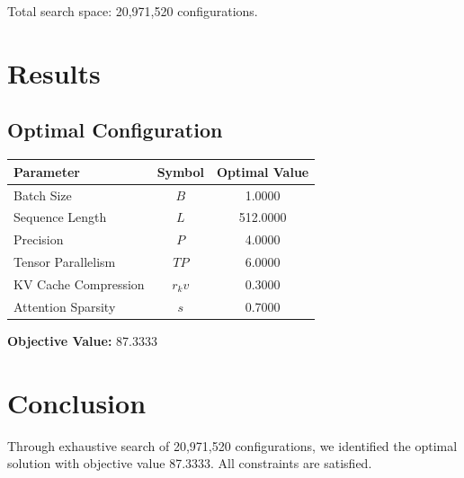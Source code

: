 \documentclass[11pt,a4paper]{article}
\begin{document}
Total search space: 20,971,520 configurations.

\section{Results}

\subsection{Optimal Configuration}

\begin{center}
\begin{tabular}{|l|c|c|}
\hline
Parameter & Symbol & Optimal Value \\
\hline
Batch Size & $B$ & 1.0000 \\
Sequence Length & $L$ & 512.0000 \\
Precision & $P$ & 4.0000 \\
Tensor Parallelism & $TP$ & 6.0000 \\
KV Cache Compression & $r_kv$ & 0.3000 \\
Attention Sparsity & $s$ & 0.7000 \\
\hline
\end{tabular}
\end{center}

\textbf{Objective Value:} 87.3333

\section{Conclusion}

Through exhaustive search of 20,971,520 configurations, we identified the optimal solution with objective value 87.3333. All constraints are satisfied.
\end{document}
